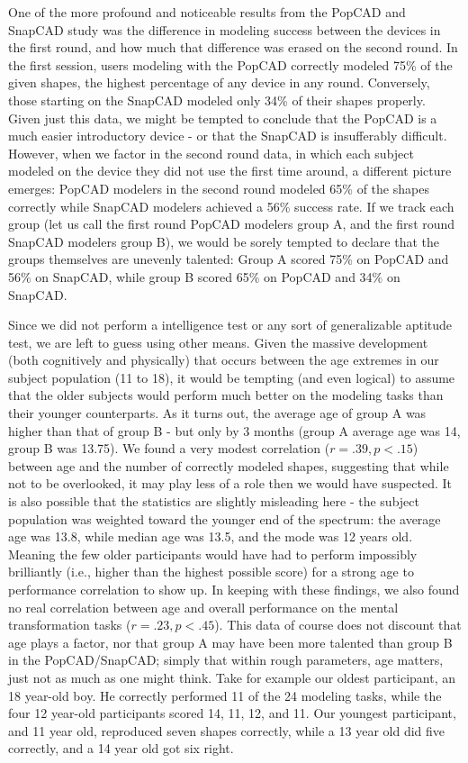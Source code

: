 One of the more profound and noticeable results from the PopCAD and SnapCAD
study was the difference in modeling success between the devices in the first
round, and how much that difference was erased on the second round. In the first
session, users modeling with the PopCAD correctly modeled 75\% of the given
shapes, the highest percentage of any device in any round. Conversely, those
starting on the SnapCAD modeled only 34\% of their shapes properly. Given just
this data, we might be tempted to conclude that the PopCAD is a much easier
introductory device - or that the SnapCAD is insufferably difficult. However,
when we factor in the second round data, in which each subject modeled on the
device they did not use the first time around, a different picture emerges:
PopCAD modelers in the second round modeled 65\% of the shapes correctly while
SnapCAD modelers achieved a 56\% success rate. If we track each group (let us
call the first round PopCAD modelers group A, and the first round SnapCAD
modelers group B), we would be sorely tempted to declare that the groups
themselves are unevenly talented: Group A scored 75\% on PopCAD and 56\% on
SnapCAD, while group B scored 65\% on PopCAD and 34\% on SnapCAD. 

Since we did not perform a intelligence test or any sort of generalizable
aptitude test, we are left to guess using other means. Given the massive
development (both cognitively and physically) that occurs between the age
extremes in our subject population (11 to 18), it would be tempting (and even
logical) to assume that the older subjects would perform much better on the
modeling tasks than their younger counterparts. As it turns out, the average age
of group A was higher than that of group B - but only by 3 months (group A
average age was 14, group B was 13.75). We found a very modest correlation ($r =
.39, p < .15$) between age and the number of correctly modeled shapes,
suggesting that while not to be overlooked, it may play less of a role then we
would have suspected. It is also possible that the statistics are slightly
misleading here - the subject population was weighted toward the younger end of
the spectrum: the average age was 13.8, while median age was 13.5, and the mode
was 12 years old. Meaning the few older participants would have had to perform
impossibly brilliantly (i.e., higher than the highest possible score) for a
strong age to performance correlation to show up. In keeping with these
findings, we also found no real correlation between age and overall performance
on the mental transformation tasks ($r = .23, p < .45$). This data of course
does not discount that age plays a factor, nor that group A may have been more
talented than group B in the PopCAD/SnapCAD; simply that within rough
parameters, age matters, just not as much as one might think. Take for example
our oldest participant, an 18 year-old boy. He correctly performed 11 of the 24
modeling tasks, while the four 12 year-old participants scored 14, 11, 12, and
11. Our youngest participant, and 11 year old, reproduced seven shapes
correctly, while a 13 year old did five correctly, and a 14 year old got six
right.


